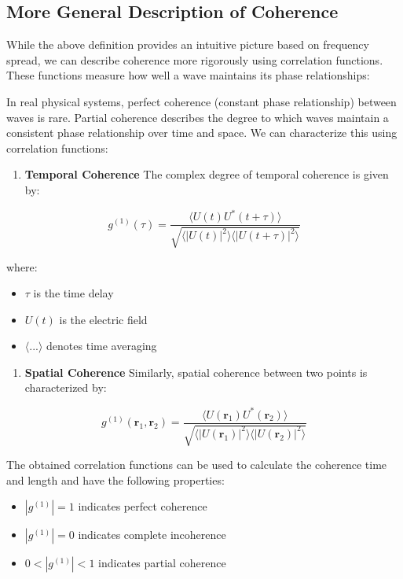 \documentclass[
  a4paper,
]{book}
\providecommand{\tightlist}{%
  \setlength{\itemsep}{0pt}\setlength{\parskip}{0pt}}
\begin{document}
\subsection{More General Description of
Coherence}\label{more-general-description-of-coherence}

While the above definition provides an intuitive picture based on
frequency spread, we can describe coherence more rigorously using
correlation functions. These functions measure how well a wave maintains
its phase relationships:

In real physical systems, perfect coherence (constant phase
relationship) between waves is rare. Partial coherence describes the
degree to which waves maintain a consistent phase relationship over time
and space. We can characterize this using correlation functions:

\begin{enumerate}
\def\labelenumi{\arabic{enumi}.}
\tightlist
\item
  \textbf{Temporal Coherence} The complex degree of temporal coherence
  is given by:
\end{enumerate}

\[g^{(1)}(\tau) = \frac{\langle U(t)U^*(t+\tau)\rangle}{\sqrt{\langle|U(t)|^2\rangle\langle|U(t+\tau)|^2\rangle}}\]

where:

\begin{itemize}
\tightlist
\item
  \(\tau\) is the time delay
\item
  \(U(t)\) is the electric field
\item
  \(\langle...\rangle\) denotes time averaging
\end{itemize}

\begin{enumerate}
\def\labelenumi{\arabic{enumi}.}
\setcounter{enumi}{1}
\tightlist
\item
  \textbf{Spatial Coherence} Similarly, spatial coherence between two
  points is characterized by:
\end{enumerate}

\[g^{(1)}(\mathbf{r}_1,\mathbf{r}_2) = \frac{\langle U(\mathbf{r}_1)U^*(\mathbf{r}_2)\rangle}{\sqrt{\langle|U(\mathbf{r}_1)|^2\rangle\langle|U(\mathbf{r}_2)|^2\rangle}}\]

The obtained correlation functions can be used to calculate the
coherence time and length and have the following properties:

\begin{itemize}
\tightlist
\item
  \(|g^{(1)}| = 1\) indicates perfect coherence
\item
  \(|g^{(1)}| = 0\) indicates complete incoherence
\item
  \(0 < |g^{(1)}| < 1\) indicates partial coherence
\end{itemize}
\end{document}
